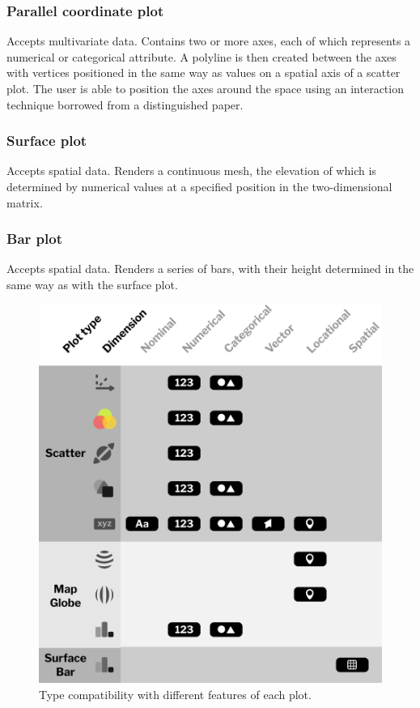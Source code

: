 \documentclass[thesis=M,english,hidelinks]{FITthesisXE}[2012/06/26]
\begin{document}
\subsubsection{Parallel coordinate plot}

Accepts multivariate data. Contains two or more axes, each of which represents a numerical or categorical attribute. A polyline is then created between the axes with vertices positioned in the same way as values on a spatial axis of a scatter plot. The user is able to position the axes around the space using an interaction technique borrowed from a distinguished paper.\autocite{imaxes}

\subsubsection{Surface plot}

Accepts spatial data. Renders a continuous mesh, the elevation of which is determined by numerical values at a specified position in the two-dimensional matrix.

\subsubsection{Bar plot}

Accepts spatial data. Renders a series of bars, with their height determined in the same way as with the surface plot.

\begin{figure}[ht]
\centering
\includegraphics[scale=0.06]{type_matrix}
\caption{Type compatibility with different features of each plot.}
\label{fig:type_matrix}
\end{figure}
\end{document}
